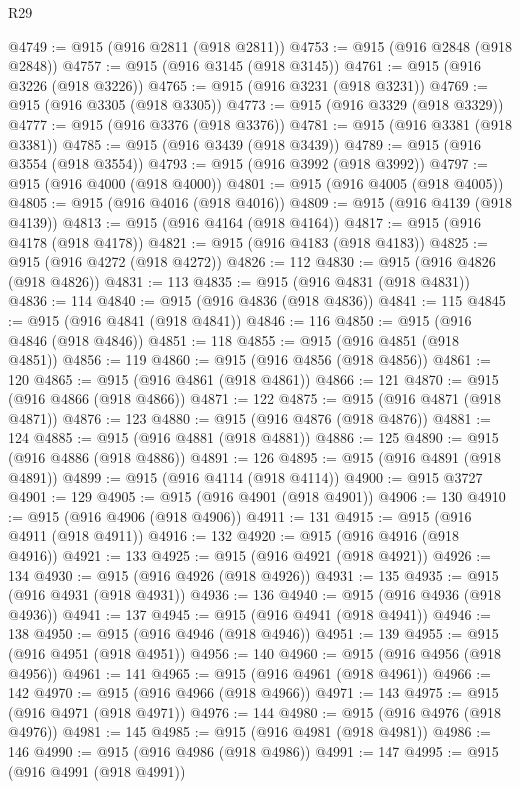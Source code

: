\begin{lexlean}{R29}
\begin{coremodule}
@4749 := @915 (@916 @2811 (@918 @2811))
@4753 := @915 (@916 @2848 (@918 @2848))
@4757 := @915 (@916 @3145 (@918 @3145))
@4761 := @915 (@916 @3226 (@918 @3226))
@4765 := @915 (@916 @3231 (@918 @3231))
@4769 := @915 (@916 @3305 (@918 @3305))
@4773 := @915 (@916 @3329 (@918 @3329))
@4777 := @915 (@916 @3376 (@918 @3376))
@4781 := @915 (@916 @3381 (@918 @3381))
@4785 := @915 (@916 @3439 (@918 @3439))
@4789 := @915 (@916 @3554 (@918 @3554))
@4793 := @915 (@916 @3992 (@918 @3992))
@4797 := @915 (@916 @4000 (@918 @4000))
@4801 := @915 (@916 @4005 (@918 @4005))
@4805 := @915 (@916 @4016 (@918 @4016))
@4809 := @915 (@916 @4139 (@918 @4139))
@4813 := @915 (@916 @4164 (@918 @4164))
@4817 := @915 (@916 @4178 (@918 @4178))
@4821 := @915 (@916 @4183 (@918 @4183))
@4825 := @915 (@916 @4272 (@918 @4272))
@4826 := 112
@4830 := @915 (@916 @4826 (@918 @4826))
@4831 := 113
@4835 := @915 (@916 @4831 (@918 @4831))
@4836 := 114
@4840 := @915 (@916 @4836 (@918 @4836))
@4841 := 115
@4845 := @915 (@916 @4841 (@918 @4841))
@4846 := 116
@4850 := @915 (@916 @4846 (@918 @4846))
@4851 := 118
@4855 := @915 (@916 @4851 (@918 @4851))
@4856 := 119
@4860 := @915 (@916 @4856 (@918 @4856))
@4861 := 120
@4865 := @915 (@916 @4861 (@918 @4861))
@4866 := 121
@4870 := @915 (@916 @4866 (@918 @4866))
@4871 := 122
@4875 := @915 (@916 @4871 (@918 @4871))
@4876 := 123
@4880 := @915 (@916 @4876 (@918 @4876))
@4881 := 124
@4885 := @915 (@916 @4881 (@918 @4881))
@4886 := 125
@4890 := @915 (@916 @4886 (@918 @4886))
@4891 := 126
@4895 := @915 (@916 @4891 (@918 @4891))
@4899 := @915 (@916 @4114 (@918 @4114))
@4900 := @915 @3727
@4901 := 129
@4905 := @915 (@916 @4901 (@918 @4901))
@4906 := 130
@4910 := @915 (@916 @4906 (@918 @4906))
@4911 := 131
@4915 := @915 (@916 @4911 (@918 @4911))
@4916 := 132
@4920 := @915 (@916 @4916 (@918 @4916))
@4921 := 133
@4925 := @915 (@916 @4921 (@918 @4921))
@4926 := 134
@4930 := @915 (@916 @4926 (@918 @4926))
@4931 := 135
@4935 := @915 (@916 @4931 (@918 @4931))
@4936 := 136
@4940 := @915 (@916 @4936 (@918 @4936))
@4941 := 137
@4945 := @915 (@916 @4941 (@918 @4941))
@4946 := 138
@4950 := @915 (@916 @4946 (@918 @4946))
@4951 := 139
@4955 := @915 (@916 @4951 (@918 @4951))
@4956 := 140
@4960 := @915 (@916 @4956 (@918 @4956))
@4961 := 141
@4965 := @915 (@916 @4961 (@918 @4961))
@4966 := 142
@4970 := @915 (@916 @4966 (@918 @4966))
@4971 := 143
@4975 := @915 (@916 @4971 (@918 @4971))
@4976 := 144
@4980 := @915 (@916 @4976 (@918 @4976))
@4981 := 145
@4985 := @915 (@916 @4981 (@918 @4981))
@4986 := 146
@4990 := @915 (@916 @4986 (@918 @4986))
@4991 := 147
@4995 := @915 (@916 @4991 (@918 @4991))

\end{coremodule}
\end{lexlean}
